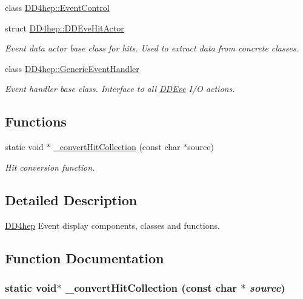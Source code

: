 \begin{DoxyCompactItemize}
class \hyperlink{class_d_d4hep_1_1_event_control}{DD4hep::EventControl}
\item 
struct \hyperlink{struct_d_d4hep_1_1_d_d_eve_hit_actor}{DD4hep::DDEveHitActor}
\begin{DoxyCompactList}\small\item\em Event data actor base class for hits. Used to extract data from concrete classes. \item\end{DoxyCompactList}\item 
class \hyperlink{class_d_d4hep_1_1_generic_event_handler}{DD4hep::GenericEventHandler}
\begin{DoxyCompactList}\small\item\em Event handler base class. Interface to all \hyperlink{struct_d_d4hep_1_1_d_d_eve}{DDEve} I/O actions. \item\end{DoxyCompactList}\end{DoxyCompactItemize}
\subsection*{Functions}
\begin{DoxyCompactItemize}
\item 
static void $\ast$ \hyperlink{group___d_d4_h_e_p___e_v_e_ga30000df70702f887aa93807c1cdb0cab}{\_\-convertHitCollection} (const char $\ast$source)
\begin{DoxyCompactList}\small\item\em Hit conversion function. \item\end{DoxyCompactList}\end{DoxyCompactItemize}


\subsection{Detailed Description}
\hyperlink{namespace_d_d4hep}{DD4hep} Event display components, classes and functions. 

\subsection{Function Documentation}
\hypertarget{group___d_d4_h_e_p___e_v_e_ga30000df70702f887aa93807c1cdb0cab}{
\subsubsection[{\_\-convertHitCollection}]{\setlength{\rightskip}{0pt plus 5cm}static void$\ast$ \_\-convertHitCollection (const char $\ast$ {\em source})}}
\label{group___d_d4_h_e_p___e_v_e_ga30000df70702f887aa93807c1cdb0cab}



